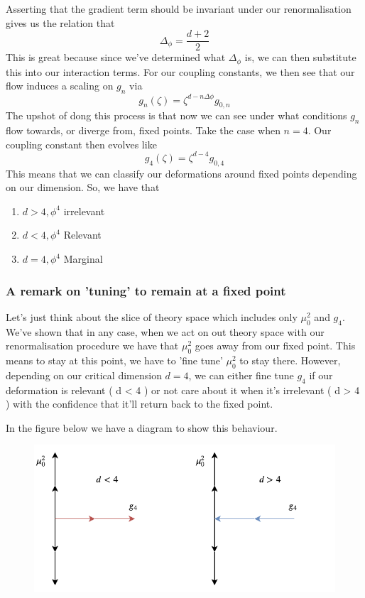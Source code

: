 Asserting that the gradient term should 
be invariant under our renormalisation gives 
us the relation that 
\[
\Delta _{ \phi } = \frac{ d + 2 }{ 2 }
\] This is great because 
since we've determined what $ \Delta_{ \phi } $
is, we can then substitute this into 
our interaction terms. For our coupling constants, we 
then see that our flow induces a scaling on 
$ g_n $ via 
\[
g _ n ( \zeta ) = \zeta ^{ d - n \Delta \phi } g_{ 0 , n }
\] The upshot of dong this process 
is that now we can see under what conditions 
$ g _ n $ flow towards, or diverge from, 
fixed points. Take the case when $ n = 4 $. 
Our coupling constant then evolves like 
\[
g _ 4 ( \zeta ) = \zeta ^{ d -4  } g_{ 0 , 4 }
\] This means that we can classify 
our deformations around fixed points depending on 
our dimension. So, we have that 
\begin{enumerate}
\item $ d > 4 , \phi ^ 4 $ irrelevant 
\item $ d < 4 , \phi ^ 4 $ Relevant 
\item $ d  = 4, \phi ^ 4 $ Marginal 
\end{enumerate} 
\subsubsection{A remark on 'tuning' to remain at a fixed point}
Let's just think about 
the slice of theory space which includes only 
$ \mu _ 0 ^ 2 $ and $ g _ 4 $. We've shown that 
in any case, when we act on out theory space 
with our renormalisation procedure we have that 
$ \mu _ 0 ^ 2  $ goes away from our fixed point. 
This means to stay at this point, we have to 
'fine tune' $ \mu _ 0 ^ 2 $ to stay there. 
However, depending on our 
critical dimension $ d =  4 $, 
we can either fine tune $ g _ 4 $ if 
our deformation is relevant ( d < 4 ) or not care about it
when it's irrelevant ( d > 4 ) with the confidence that 
it'll return back to the fixed point.

In the figure below we have a diagram to show this 
behaviour. 

\begin{figure}[htpb]
	\centering
	\includegraphics[width=0.8\linewidth]{figures/rg_flow.pdf}
	\caption{}%
	\label{fig:}
\end{figure}


